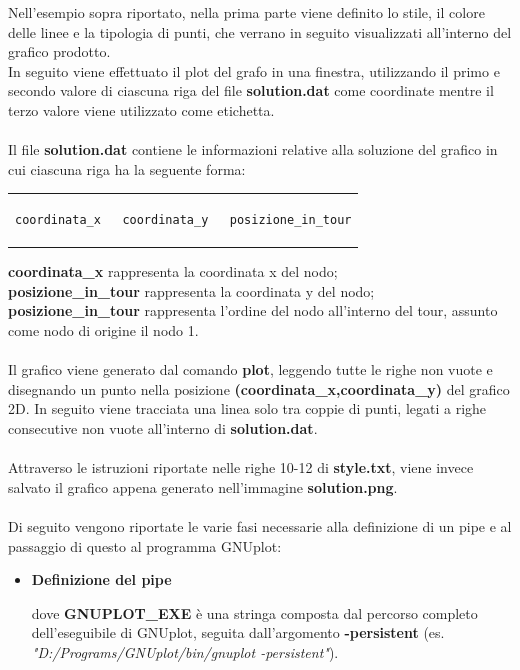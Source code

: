 \begin{center}
\begin{center}
Nell'esempio sopra riportato, nella prima parte viene definito lo stile, il colore delle linee e la tipologia di punti, che verrano in seguito visualizzati all'interno del grafico prodotto.\\In seguito viene effettuato il plot del grafo in una finestra, utilizzando il primo e secondo valore di ciascuna riga del file \textbf{solution.dat} come coordinate mentre il terzo valore viene utilizzato come etichetta.\\\\
Il file \textbf{solution.dat} contiene le informazioni relative alla soluzione del grafico in cui ciascuna riga ha la seguente forma:
\begin{center}
\begin{tabular}{c}
\begin{lstlisting}[linewidth=290pt,basicstyle=\footnotesize\sffamily,]     
coordinata_x   coordinata_y   posizione_in_tour
\end{lstlisting}
\end{tabular}
\end{center}
\textbf{coordinata\_x} rappresenta la coordinata x del nodo;\\
\textbf{posizione\_in\_tour} rappresenta la coordinata y del nodo;\\
\textbf{posizione\_in\_tour} rappresenta l'ordine del nodo all'interno del tour, assunto come nodo di origine il nodo 1.\\\\
Il grafico viene generato dal comando \textbf{plot}, leggendo tutte le righe non vuote e disegnando un punto nella posizione \textbf{(coordinata\_x,coordinata\_y)} del grafico 2D. In seguito viene tracciata una linea solo tra coppie di punti, legati a righe consecutive non vuote all'interno di \textbf{solution.dat}.\\\\
Attraverso le istruzioni riportate nelle righe 10-12 di \textbf{style.txt}, viene invece salvato il grafico appena generato nell'immagine \textbf{solution.png}.\\\\
Di seguito vengono riportate le varie fasi necessarie alla definizione di un pipe e al passaggio di questo al programma GNUplot:
\begin{itemize}
\item{\textbf{Definizione del pipe}

dove \textbf{GNUPLOT\_EXE} è una stringa composta dal percorso completo dell'eseguibile di GNUplot, seguita dall'argomento \textbf{-persistent} (es. \textit{"D:/Programs/GNUplot/bin/gnuplot -persistent"}).
}
\end{itemize}
\end{center}
\end{center}
